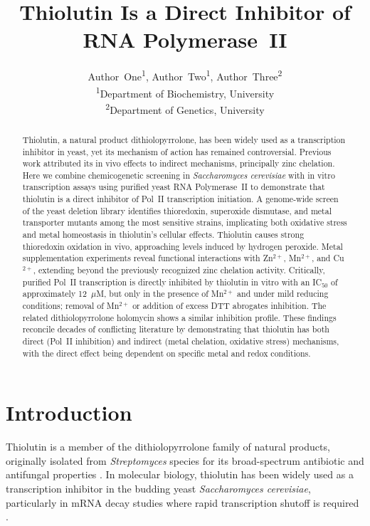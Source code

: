 \documentclass[11pt]{article}
\title{Thiolutin Is a Direct Inhibitor of RNA Polymerase~II}
\author{
  Author~One\textsuperscript{1},
  Author~Two\textsuperscript{1},
  Author~Three\textsuperscript{2} \\
  \textsuperscript{1}Department of Biochemistry, University \\
  \textsuperscript{2}Department of Genetics, University
}
\date{}
\begin{document}
\maketitle

\begin{abstract}
Thiolutin, a natural product dithiolopyrrolone, has been widely used as a transcription inhibitor in yeast, yet its mechanism of action has remained controversial. Previous work attributed its in vivo effects to indirect mechanisms, principally zinc chelation. Here we combine chemicogenetic screening in \textit{Saccharomyces cerevisiae} with in vitro transcription assays using purified yeast RNA Polymerase~II to demonstrate that thiolutin is a direct inhibitor of Pol~II transcription initiation. A genome-wide screen of the yeast deletion library identifies thioredoxin, superoxide dismutase, and metal transporter mutants among the most sensitive strains, implicating both oxidative stress and metal homeostasis in thiolutin's cellular effects. Thiolutin causes strong thioredoxin oxidation in vivo, approaching levels induced by hydrogen peroxide. Metal supplementation experiments reveal functional interactions with Zn$^{2+}$, Mn$^{2+}$, and Cu$^{2+}$, extending beyond the previously recognized zinc chelation activity. Critically, purified Pol~II transcription is directly inhibited by thiolutin in vitro with an IC$_{50}$ of approximately 12~$\mu$M, but only in the presence of Mn$^{2+}$ and under mild reducing conditions; removal of Mn$^{2+}$ or addition of excess DTT abrogates inhibition. The related dithiolopyrrolone holomycin shows a similar inhibition profile. These findings reconcile decades of conflicting literature by demonstrating that thiolutin has both direct (Pol~II inhibition) and indirect (metal chelation, oxidative stress) mechanisms, with the direct effect being dependent on specific metal and redox conditions.
\end{abstract}

\section{Introduction}

Thiolutin is a member of the dithiolopyrrolone family of natural products, originally isolated from \textit{Streptomyces} species for its broad-spectrum antibiotic and antifungal properties \citep{celmer1952,jimenez1973}. In molecular biology, thiolutin has been widely used as a transcription inhibitor in the budding yeast \textit{Saccharomyces cerevisiae}, particularly in mRNA decay studies where rapid transcription shutoff is required \citep{parker1991}.
\end{document}
